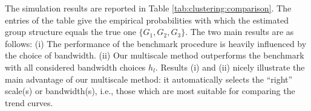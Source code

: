 \documentclass[12pt]{article}
\begin{document}
%
%
%
%
%


The simulation results are reported in Table \ref{tab:clustering:comparison}. The entries of the table give the empirical probabilities with which the estimated group structure equals the true one $\{G_1,G_2,G_3\}$. The two main results are as follows: (i) The performance of the benchmark procedure is heavily influenced by the choice of bandwidth.
(ii) Our multiscale method outperforms the benchmark with all considered bandwidth choices $h_l$. Results (i) and (ii) nicely illustrate the main advantage of our multiscale method: it automatically selects the ``right'' scale(s) or bandwidth(s), i.e., those which are most suitable for comparing the trend curves.


\end{document}
